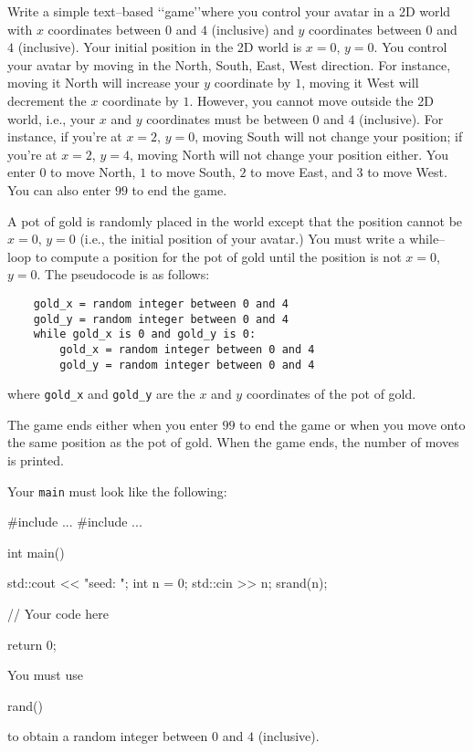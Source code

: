 Write a simple text--based \lq\lq game\rq\rq where you control your avatar in a
2D world with $x$ coordinates between $0$ and $4$ (inclusive) and $y$
coordinates between $0$ and $4$ (inclusive). Your initial position in the 2D
world is $x = 0$, $y = 0$. You control your avatar by moving in the North, South,
East, West direction. For instance, moving it North will increase your $y$
coordinate by $1$, moving it West will decrement the $x$ coordinate by $1$.
However, you cannot move outside the 2D world, i.e., your $x$ and $y$
coordinates must be between $0$ and $4$ (inclusive). For instance, if you're at
$x = 2$, $y = 0$, moving South will not change your position; if you're at 
$x = 2$, $y = 4$, moving North will not change your position either. You enter
$0$ to move North, $1$ to move South, $2$ to move East, and $3$ to move West.
You can also enter $99$ to end the game.

A pot of gold is randomly placed in the world except that the position cannot 
be $x=0$, $y=0$ (i.e., the initial position of your avatar.) You must write a 
while--loop to compute a position for the pot of gold until the position is not
$x=0$, $y=0$. The pseudocode is as follows:

\begin{Verbatim}
	gold_x = random integer between 0 and 4
	gold_y = random integer between 0 and 4
	while gold_x is 0 and gold_y is 0:
	    gold_x = random integer between 0 and 4
	    gold_y = random integer between 0 and 4
\end{Verbatim}

where \verb!gold_x! and \verb!gold_y! are the $x$ and $y$ coordinates of the
pot of gold.

The game ends either when you enter $99$ to end the game or when you move onto
the same position as the pot of gold. When the game ends, the number of moves
is printed.

Your \verb!main! must look like the following:
\begin{console}
#include ...
#include ...

int main()
{
    std::cout << "seed: ";
    int n = 0;
    std::cin >> n;
    srand(n);

    // Your code here

    return 0;
}
\end{console}

You must use
\begin{console}
rand() %
\end{console}
to obtain a random integer between $0$ and $4$ (inclusive).


